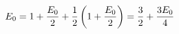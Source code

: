 \documentclass[preview]{standalone}
\begin{document}
\begin{align*}
\special{dvisvgm:raw <g id='unique000'>}E_0=1+\dfrac{E_0}{2}+\dfrac{1}{2}\left(1+\dfrac{E_0}{2}\right)=\dfrac{3}{2}+\dfrac{3E_0}{4}\special{dvisvgm:raw </g>}
\end{align*}
\end{document}
